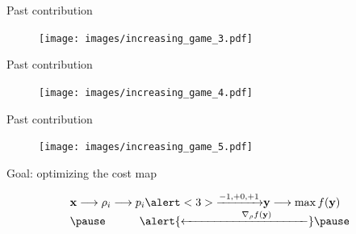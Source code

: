 \documentclass[10pt]{beamer}
\begin{document}
\begin{frame}{Past contribution}
  \begin{figure}
        \texttt{[image: images/increasing\_game\_3.pdf]}
\end{figure}
\end{frame}


\begin{frame}{Past contribution}
  \begin{figure}
        \texttt{[image: images/increasing\_game\_4.pdf]}
\end{figure}
\end{frame}


\begin{frame}{Past contribution}
  \begin{figure}
        \texttt{[image: images/increasing\_game\_5.pdf]}
\end{figure}
\end{frame}



\begin{frame}{Goal: optimizing the cost map}

\begin{equation*}
    \begin{array}{ll}
    \mathbf{x} \longrightarrow \rho_i \longrightarrow p_i \alert<3>{\xrightarrow{-1, +0, +1}} \mathbf{y} \longrightarrow \max f(\mathbf{y})
    \\ \pause
    \hspace{3em} \alert{\xleftarrow{\hspace{5em} \nabla_\rho f(\mathbf{y}) \hspace{3em}}} \pause
    \end{array}
\end{equation*}

\end{frame}
\end{document}
